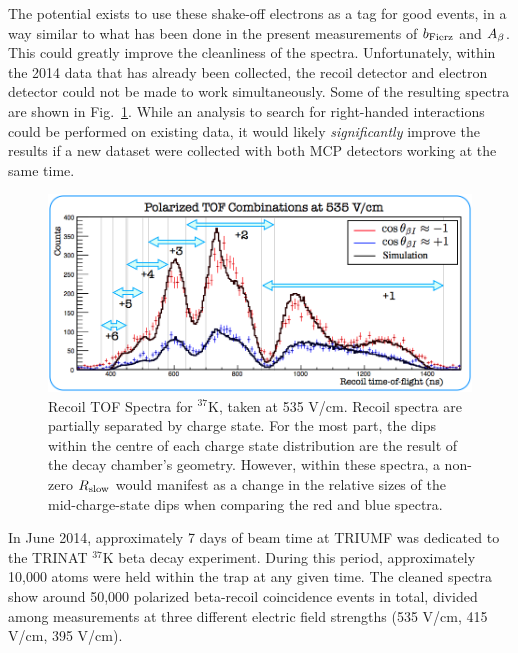 The potential exists to use these shake-off electrons as a tag for good events, in a way similar to what has been done in the present measurements of $b_{\mathrm{Fierz}}$ and $A_{\beta}$.  This could greatly improve the cleanliness of the spectra.  Unfortunately, within the 2014 data that has already been collected, the recoil detector and electron detector could not be made to work simultaneously.  Some of the resulting spectra are shown in Fig.~\ref{fig:RslowSpectra}.  While an analysis to search for right-handed interactions could be performed on existing data, it would likely \emph{significantly} improve the results if a new dataset were collected with both \ac{MCP} detectors working at the same time. 


\begin{figure}[htb]
	\centering
	\includegraphics[width=.999\linewidth]{Figures/Rslow_tof_squished.png}
	\caption[Recoil TOF Spectra at 535 V/cm]{Recoil TOF Spectra for $^{37}$K, taken at 535 V/cm.  Recoil spectra are partially separated by charge state.  For the most part, the dips within the centre of each charge state distribution are the result of the decay chamber's geometry.  However, within these spectra, a non-zero $R_{\textrm{slow}}$ would manifest as a change in the relative sizes of the mid-charge-state dips when comparing the red and blue spectra.	}
	\label{fig:RslowSpectra}
\end{figure}



In June 2014, approximately 7 days of beam time at TRIUMF was dedicated to the TRINAT $^{37}\textrm{K}$ beta decay experiment.  During this period, approximately 10,000 atoms were held within the trap at any given time.  The cleaned spectra show around 50,000 polarized beta-recoil coincidence events in total, divided among measurements at three different electric field strengths (535 V/cm, 415 V/cm, 395 V/cm).

